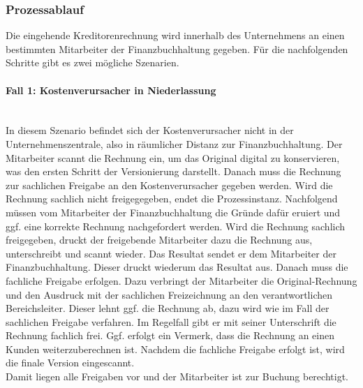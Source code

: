 \subsubsection{Prozessablauf}
Die eingehende Kreditorenrechnung wird innerhalb des Unternehmens an einen bestimmten Mitarbeiter der Finanzbuchhaltung gegeben.
Für die nachfolgenden Schritte gibt es zwei mögliche Szenarien.

\paragraph{Fall 1: Kostenverursacher in Niederlassung}
~\\ 
In diesem Szenario befindet sich der Kostenverursacher nicht in der Unternehmenszentrale, also in räumlicher Distanz zur Finanzbuchhaltung.
Der Mitarbeiter scannt die Rechnung ein, um das Original digital zu konservieren, was den ersten Schritt der Versionierung darstellt.
Danach muss die Rechnung zur sachlichen Freigabe an den Kostenverursacher gegeben werden. 
Wird die Rechnung sachlich nicht freigegegeben, endet die Prozessinstanz.
Nachfolgend müssen vom Mitarbeiter der Finanzbuchhaltung die Gründe dafür eruiert und ggf. eine korrekte Rechnung nachgefordert werden.
Wird die Rechnung sachlich freigegeben, druckt der freigebende Mitarbeiter dazu die Rechnung aus, unterschreibt und scannt wieder.
Das Resultat sendet er dem Mitarbeiter der Finanzbuchhaltung.
Dieser druckt wiederum das Resultat aus.
Danach muss die fachliche Freigabe erfolgen.
Dazu verbringt der Mitarbeiter die Original-Rechnung und den Ausdruck mit der sachlichen Freizeichnung an den verantwortlichen Bereichsleiter.
Dieser lehnt ggf. die Rechnung ab, dazu wird wie im Fall der sachlichen Freigabe verfahren.
Im Regelfall gibt er mit seiner Unterschrift die Rechnung fachlich frei.
Ggf. erfolgt ein Vermerk, dass die Rechnung an einen Kunden weiterzuberechnen ist. 
Nachdem die fachliche Freigabe erfolgt ist, wird die finale Version eingescannt.\\
Damit liegen alle Freigaben vor und der Mitarbeiter ist zur Buchung berechtigt.

